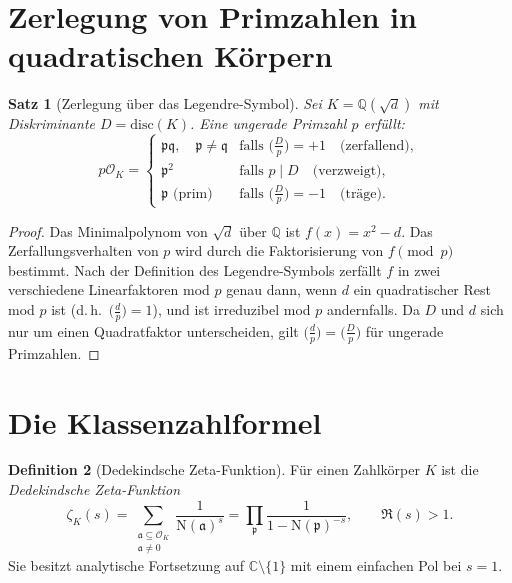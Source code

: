 \documentclass[12pt,a4paper]{amsart}
\newtheorem{theorem}{Satz}[section]
\theoremstyle{definition}
\newtheorem{definition}[theorem]{Definition}
\newcommand{\Q}{\mathbb{Q}}
\newcommand{\C}{\mathbb{C}}
\newcommand{\OK}{\mathcal{O}_K}
\newcommand{\p}{\mathfrak{p}}
\newcommand{\q}{\mathfrak{q}}
\newcommand{\aaa}{\mathfrak{a}}
\newcommand{\Nm}{\mathrm{N}}
\newcommand{\disc}{\mathrm{disc}}
\begin{document}
\section{Zerlegung von Primzahlen in quadratischen Körpern}

\begin{theorem}[Zerlegung über das Legendre-Symbol]
\label{thm:quad_zerlegung}
Sei $K = \Q(\sqrt{d})$ mit Diskriminante $D = \disc(K)$.
Eine ungerade Primzahl $p$ erfüllt:
\[
  p\OK =
  \begin{cases}
    \p\q, \quad \p \ne \q & \text{falls } \bigl(\tfrac{D}{p}\bigr) = +1
    \quad\text{(zerfallend)}, \\[2pt]
    \p^2 & \text{falls } p \mid D
    \quad\text{(verzweigt)}, \\[2pt]
    \p \text{ (prim)} & \text{falls } \bigl(\tfrac{D}{p}\bigr) = -1
    \quad\text{(träge)}.
  \end{cases}
\]
\end{theorem}

\begin{proof}
Das Minimalpolynom von $\sqrt{d}$ über $\Q$ ist $f(x) = x^2 - d$.
Das Zerfallungsverhalten von $p$ wird durch die Faktorisierung von $f \pmod{p}$
bestimmt.  Nach der Definition des Legendre-Symbols zerfällt $f$ in zwei
verschiedene Linearfaktoren mod $p$ genau dann, wenn $d$ ein quadratischer
Rest mod $p$ ist (d.\,h.\ $\bigl(\tfrac{d}{p}\bigr) = 1$), und ist
irreduzibel mod $p$ andernfalls.  Da $D$ und $d$ sich nur um einen
Quadratfaktor unterscheiden, gilt $\bigl(\tfrac{d}{p}\bigr) = \bigl(\tfrac{D}{p}\bigr)$
für ungerade Primzahlen.
\end{proof}

\section{Die Klassenzahlformel}

\begin{definition}[Dedekindsche Zeta-Funktion]
\label{def:dedekind_zeta}
Für einen Zahlkörper $K$ ist die \emph{Dedekindsche Zeta-Funktion}
\[
  \zeta_K(s) = \sum_{\substack{\aaa \subseteq \OK \\ \aaa \ne 0}}
  \frac{1}{\Nm(\aaa)^s}
  = \prod_{\p} \frac{1}{1 - \Nm(\p)^{-s}}, \qquad \Re(s) > 1.
\]
Sie besitzt analytische Fortsetzung auf $\C \setminus \{1\}$ mit einem
einfachen Pol bei $s = 1$.
\end{definition}
\end{document}
